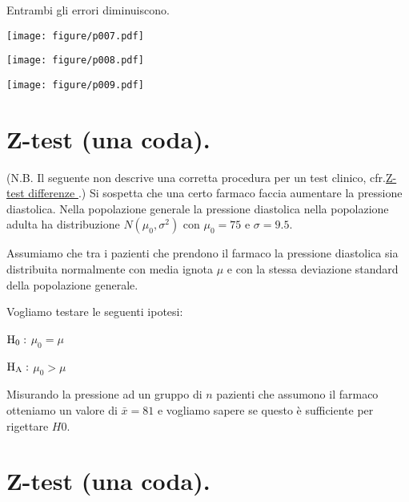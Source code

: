 \documentclass[10pt,openany]{book}
\def\H0{{\rm H_0}}
\def\HA{{\rm H_A}}
\theoremstyle{mio}
\theoremstyle{liscio}
\begin{document}
Entrambi gli errori diminuiscono.


\hfil\texttt{[image: figure/p007.pdf]}

\hfil\texttt{[image: figure/p008.pdf]}

\hfil\texttt{[image: figure/p009.pdf]}



\clearpage\section{Z-test (una coda).}

(N.B. Il seguente non descrive una corretta procedura per un test clinico, cfr.\@ \hyperref[Z-test differenze (una coda)]{Z-test differenze \faShare}.) Si sospetta che una certo farmaco faccia aumentare la pressione diastolica. Nella popolazione generale la pressione diastolica nella popolazione adulta ha distribuzione $N(\mu_0,\sigma^2)$ con $\mu_0=75$ e $\sigma=9.5$. 

Assumiamo che tra i pazienti che prendono il farmaco la pressione diastolica sia distribuita normalmente con media ignota $\mu$ e con la stessa deviazione standard della popolazione generale.

Vogliamo testare le seguenti ipotesi:

$\H0:$ $\mu_0=\mu$

$\HA:$ $\mu_0>\mu$

Misurando la pressione ad un gruppo di $n$ pazienti che assumono il farmaco otteniamo un valore di $\bar x=81$ e vogliamo sapere se questo è sufficiente per rigettare $H0$.


\clearpage\section{Z-test (una coda).}
\end{document}
